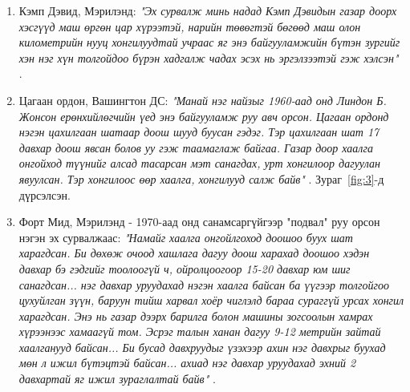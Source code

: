 \documentclass[10pt,twocolumn,letterpaper]{article}
\begin{document}
\begin{flushleft}
\begin{enumerate}
    \item Кэмп Дэвид, Мэрилэнд: \textit{"Эх сурвалж минь надад Кэмп Дэвидын газар доорх хэсгүүд маш өргөн цар хүрээтэй, нарийн төвөгтэй бөгөөд маш олон километрийн нууц хонгилуудтай учраас яг энэ байгууламжийн бүтэн зургийг хэн нэг хүн толгойдоо бүрэн хадгалж чадах эсэх нь эргэлзээтэй гэж хэлсэн"} \cite{22}.
    \item Цагаан ордон, Вашингтон ДС: \textit{"Манай нэг найзыг 1960-аад онд Линдон Б. Жонсон ерөнхийлөгчийн үед энэ байгууламж руу авч орсон. Цагаан ордонд нэгэн цахилгаан шатаар доош шууд буусан гэдэг. Тэр цахилгаан шат 17 давхар доош явсан болов уу гэж таамаглаж байгаа. Газар доор хаалга онгойход түүнийг алсад тасарсан мэт санагдах, урт хонгилоор дагуулан явуулсан. Тэр хонгилоос өөр хаалга, хонгилууд салж байв"} \cite{22}. Зураг~\ref{fig:3}-д дүрсэлсэн.
    \item Форт Мид, Мэрилэнд - 1970-аад онд санамсаргүйгээр "подвал" руу орсон нэгэн эх сурвалжаас: \textit{"Намайг хаалга онгойлгоход доошоо буух шат харагдсан. Би дөхөж очоод хашлага дагуу доош харахад доошоо хэдэн давхар бэ гэдгийг тоолоогүй ч, ойролцоогоор 15-20 давхар юм шиг санагдсан... нэг давхар уруудахад нэгэн хаалга байсан ба үүгээр толгойгоо цухуйлган зүүн, баруун тийш харвал хоёр чиглэлд бараа сураггүй урсах хонгил харагдсан. Энэ нь газар дээрх барилга болон машины зогсоолын хамрах хүрээнээс хамаагүй том. Эсрэг талын ханан дагуу 9-12 метрийн зайтай хаалганууд байсан... Би бусад давхруудыг үзэхээр ахин нэг давхрыг буухад мөн л ижил бүтэцтэй байсан... ахиад нэг давхар уруудахад эхний 2 давхартай яг ижил зураглалтай байв"} \cite{22}.
\end{enumerate}
\end{flushleft}
\end{document}
